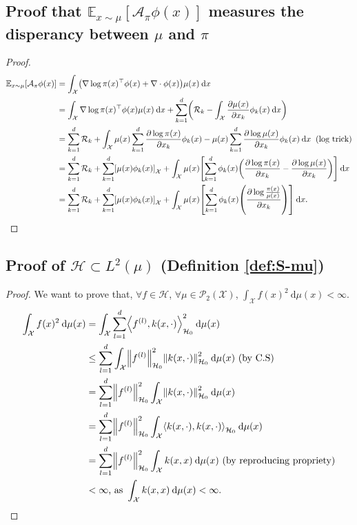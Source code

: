 \documentclass{article}
\newcommand{\E}{\mathbb{E}}
\newcommand{\X}{\mathcal{X}}
\newcommand{\A}{\mathcal{A}}
\renewcommand{\P}{\mathcal{P}}
\renewcommand{\H}{\mathcal{H}}
\newcommand{\diff}[2]{\frac{\partial #1}{\partial #2}}
\renewcommand{\d}{\: \mathrm{d}}
\DeclarePairedDelimiter{\norm}{\|}{\|}
\DeclarePairedDelimiter{\pare}{(}{)}
\DeclarePairedDelimiter{\sq}{[}{]}
\DeclarePairedDelimiter{\sca}{\langle}{\rangle}
\begin{document}
\subsection{Proof that $\E_{x \sim \mu}[\A_\pi \phi (x)]$ measures the disperancy between $\mu$ and $\pi$}
\begin{proof}\label{proof:Esp_distance}
    \begin{equation*}
  \begin{split}
    \E_{x \sim \mu}[\A_\pi \phi (x)] &=
      \int_\X \pare*{ \nabla \log \pi(x)^\top \phi(x) + \nabla \cdot \phi(x) } \mu(x) \d x \\
    &= \int_\X \nabla \log \pi(x)^\top \phi(x) \mu(x) \d x +
    \sum_{k=1}^d \pare*{ \mathcal{R}_k - \int_\X \diff{\mu(x)}{x_k} \phi_k(x) \d x} \\
    &= \sum_{k=1}^d \mathcal{R}_k +
      \int_\X  \mu(x) \sum_{k=1}^d \diff{\log \pi(x)}{x_k}\phi_k(x) -
    \mu(x) \sum_{k=1}^d \diff{\log \mu(x)}{x_k} \phi_k(x) \d x \;\; \text{(log trick)} \\
    &= \sum_{k=1}^d \mathcal{R}_k +
      \sum_{k=1}^d \sq*{\mu(x) \phi_k(x)}_\X + \int_\X  \mu(x) \sq*{ \sum_{k=1}^d \phi_k(x) \pare*{ \diff{\log \pi(x)}{x_k} - \diff{\log \mu(x)}{x_k}}} \d x \\
    &= \sum_{k=1}^d \mathcal{R}_k +
      \sum_{k=1}^d \sq*{\mu(x) \phi_k(x)}_\X + \int_\X  \mu(x) \sq*{ \sum_{k=1}^d \phi_k(x) \pare*{ \diff{\log \frac{\pi(x)}{\mu(x)}}{x_k}}} \d x.
  \end{split}
\end{equation*}
\end{proof}

\subsection{Proof of $\H \subset L^2(\mu)$ (Definition \ref{def:S-mu})}\label{pro:H-L2}
\begin{proof}
  We want to prove that, $\forall f \in \H$, 
  $\forall \mu \in \P_2(\X)$, $\int_\X f(x)^2 \d \mu(x) < \infty$.
  \begin{align*}
    \int_\X f(x)^2 \d \mu(x) &= \int_\X \sum_{l=1}^d \sca*{ f^{(l)}, k(x, \cdot) }^2_{\H_0} \d \mu(x) \\
    &\leq \sum_{l=1}^d \int_\X \norm*{f^{(l)}}^2_{\H_0} \norm*{k(x, \cdot)}^2_{\H_0} \d \mu(x)
      \text{ (by C.S)} \\
    &= \sum_{l=1}^d \norm*{f^{(l)}}^2_{\H_0} \int_\X \norm*{k(x, \cdot)}^2_{\H_0} \d \mu(x) \\
    &= \sum_{l=1}^d \norm*{f^{(l)}}^2_{\H_0} \int_\X \sca*{k(x, \cdot), k(x, \cdot)}_{\H_0} \d \mu(x) \\
    &= \sum_{l=1}^d \norm*{f^{(l)}}^2_{\H_0} \int_\X k(x, x) \d \mu(x)
      \text{ (by reproducing propriety)} \\
    &< \infty \text{, as } \int_\X k(x, x) \d \mu(x) < \infty.
  \end{align*}
\end{proof}
\end{document}
